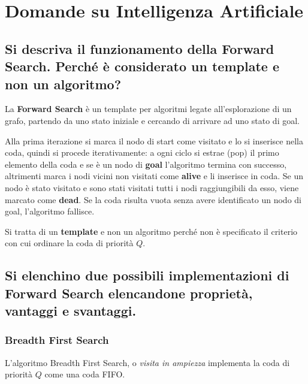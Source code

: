 \documentclass[\main/main.tex]{subfiles}
\begin{document}
\section{Domande su Intelligenza Artificiale}

\subsection{Si descriva il funzionamento della Forward Search.  Perché è considerato un template e non un algoritmo?}
La \textbf{Forward Search} è un template per algoritmi legate all'esplorazione di un grafo, partendo da uno stato iniziale e cercando di arrivare ad uno stato di goal.

Alla prima iterazione si marca il nodo di start come visitato e lo si inserisce nella coda, quindi si procede iterativamente: a ogni ciclo si estrae (pop) il primo elemento della coda e se è un nodo di \textbf{goal} l'algoritmo termina con successo, altrimenti marca i nodi vicini non visitati come \textbf{alive} e li inserisce in coda. Se un nodo è stato visitato e sono stati visitati tutti i nodi raggiungibili da esso, viene marcato come \textbf{dead}. Se la coda risulta vuota senza avere identificato un nodo di goal, l'algoritmo fallisce.

Si tratta di un \textbf{template} e non un algoritmo perché non è specificato il criterio con cui ordinare la coda di priorità $Q$.

\begin{algorithm}
	\caption{Algoritmo Forward Search}
\end{algorithm}

\subsection{Si elenchino due possibili implementazioni di Forward Search elencandone proprietà, vantaggi e svantaggi.}

\subsubsection{Breadth First Search}
L'algoritmo Breadth First Search, o \textit{visita in ampiezza} implementa la coda di priorità $Q$ come una coda FIFO.
\end{document}
